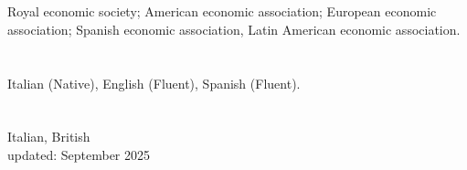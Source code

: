 \documentclass[margin, 11pt]{res} %
\begin{document}
\begin{resume}
 
\section{}
Royal economic society; American economic association; European economic association; Spanish economic association, Latin American economic association.

\section{}
Italian (Native), English (Fluent), Spanish (Fluent).

\section{}
Italian, British \\




%
%
%


\centering
updated: September 2025
\end{resume}
\end{document}
